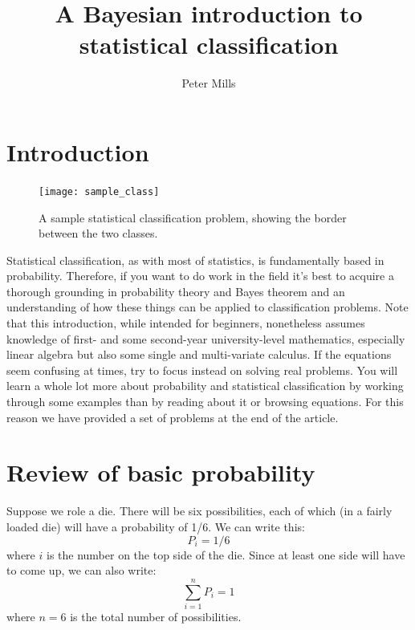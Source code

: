 \documentclass{article}
\begin{document}
\title{A Bayesian introduction to statistical classification}

\author{Peter Mills}

\maketitle

\section{Introduction}

\begin{figure}
	\texttt{[image: sample\_class]}
	\caption{A sample statistical classification problem, showing the border between the two classes.}
\end{figure}

Statistical classification, as with most of statistics, is fundamentally based
in probability.
Therefore, if you want to do work in the field it's best to acquire a thorough 
grounding in probability theory and Bayes theorem and an understanding of how 
these things
can be applied to classification problems.
Note that this introduction, while intended for beginners, nonetheless assumes
knowledge of first- and some second-year university-level mathematics, 
especially linear algebra but also some single and multi-variate calculus.
If the equations seem confusing at times, try to focus instead on 
solving real problems.
You will learn a whole lot more about probability and statistical 
classification by working through some examples than by reading about it
or browsing equations.
For this reason we have provided a set of problems at the end of the article.

\section{Review of basic probability}

Suppose we role a die. There will be six possibilities, each of which
(in a fairly loaded die) will have a probability of 1/6.
We can write this:
\begin{equation}
	P_i = 1/6
\end{equation}
where $i$ is the number on the top side of the die.
Since at least one side will have to come up, we can also write:
\begin{equation}
	\sum_{i=1}^n P_i = 1
\end{equation}
where $n=6$ is the total number of possibilities.
\end{document}

